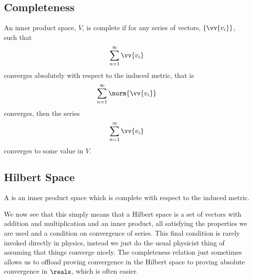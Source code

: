     \subsection{Completeness}
    An inner product space, \(V\), is complete if for any series of vectors, \(\{\vv{v_i}\}\), such that
    \begin{equation}
        \sum_{n=1}^{\infty} \vv{v_i}
    \end{equation}
    converges absolutely with respect to the induced metric, that is
    \begin{equation}
        \sum_{n=1}^{\infty} \norm{\vv{v_i}}
    \end{equation}
    converges, then the series
    \begin{equation}
        \sum_{n=1}^{\infty} \vv{v_i}
    \end{equation}
    converges to some value in \(V\).
    
    \subsection{Hilbert Space}
    A  is an inner product space which is complete with respect to the induced metric.
    
    We now see that this simply means that a Hilbert space is a set of vectors with addition and multiplication and an inner product, all satisfying the properties we are used and a condition on convergence of series.
    This final condition is rarely invoked directly in physics, instead we just do the usual physicist thing of assuming that things converge nicely.
    The completeness relation just sometimes allows us to offload proving convergence in the Hilbert space to proving absolute convergence in \(\reals\), which is often easier.